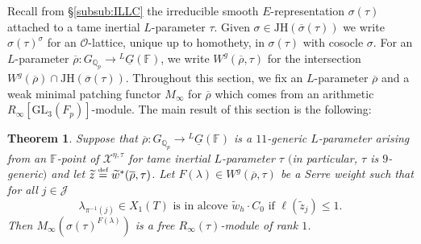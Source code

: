 \documentclass[oneside,a4paper,english, 11pt]{amsart}
\theoremstyle{plain}
\newtheorem{thm}{Theorem}[subsection]
\theoremstyle{plain}
\theoremstyle{plain}
\theoremstyle{plain}
\theoremstyle{plain}
\theoremstyle{plain}
\theoremstyle{definition}
\theoremstyle{definition}
\theoremstyle{definition}
\theoremstyle{remark}
\numberwithin{equation}{section}
\newcommand{\Qp}{\mathbb{Q}_p}
\newcommand{\F}{\mathbb{F}}
\newcommand{\cJ}{\mathcal{J}}
\newcommand{\cO}{\mathcal{O}}
\newcommand{\cX}{\mathcal{X}}
\newcommand{\GL}{\mathrm{GL}}
\newcommand{\un}[1]{\underline{#1}}
\newcommand{\tld}[1]{\widetilde{#1}}
\newcommand{\JH}{\mathrm{JH}}
\newcommand{\rhobar}{\overline{\rho}}
\newcommand{\defeq}{\stackrel{\textrm{\tiny{def}}}{=}}
\newcommand{\ovl}[1]{\overline{#1}}
\newcommand{\ra}{\rightarrow}
\begin{document}
Recall from \S \ref{subsub:ILLC} the irreducible smooth $E$-representation $\sigma(\tau)$ attached to a tame inertial $L$-parameter $\tau$.
Given $\sigma\in \JH(\ovl{\sigma}(\tau))$ we write $\sigma(\tau)^\sigma$ for an $\cO$-lattice, unique up to homothety, in $\sigma(\tau)$ with cosocle $\sigma$. 
For an $L$-parameter $\rhobar:G_{\Qp}\ra{}^L\un{G}(\F)$, we write $W^g(\rhobar,\tau)$ for the intersection $W^g(\rhobar)\cap \JH(\ovl{\sigma}(\tau))$.
Throughout this section, we fix an $L$-parameter $\rhobar$ and a weak minimal patching functor $M_\infty$ for $\rhobar$ which comes from an arithmetic $R_\infty[\GL_3(F_p)]$-module.
The main result of this section is the following:

\begin{thm}\label{thm:cyclic}
Suppose that $\rhobar:G_{\Qp}\ra{}^L\un{G}(\F)$ is a $11$-generic $L$-parameter arising from an $\F$-point of $\cX^{\eta,\tau}$ for tame inertial $L$-parameter $\tau$ $($in particular, $\tau$ is $9$-generic$)$ and let $\tld{z}\defeq \tld{w}^*(\rhobar,\tau)$. 
Let $F(\lambda)\in W^g(\rhobar,\tau)$ be a Serre weight such that for all $j\in \cJ$ 
\begin{equation}
\label{up:each:emb}
\lambda_{\pi^{-1}(j)}\in X_1(T) \text{ is in alcove $\tld{w}_h\cdot C_0$ if } \ell(\tld{z}_j)\leq 1.
\end{equation} 
Then $M_\infty(\sigma(\tau)^{F(\lambda)})$ is a free $R_\infty(\tau)$-module of rank $1$. 
\end{thm}
\end{document}
